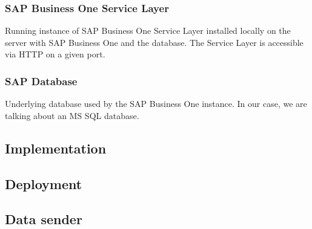 \subsubsection{SAP Business One Service Layer}
Running instance of SAP Business One Service Layer installed locally on the server with SAP Business One and the database. 
The Service Layer is accessible via HTTP on a given port.

\subsubsection{SAP Database}
Underlying database used by the SAP Business One instance.
In our case, we are talking about an MS SQL database.


\subsection{Implementation}
\label{subsec:implementation}
\subsection{Deployment}
\label{subsec:deployment}

\subsection{Data sender}
\label{subsec:data-sender}

